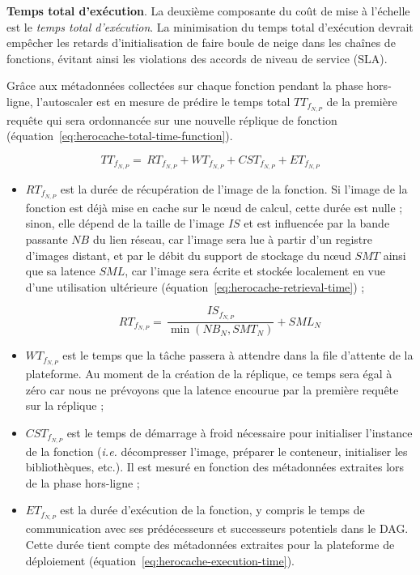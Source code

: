 {\textbf{Temps total d'exécution}. La deuxième composante du coût de mise à l'échelle est le \textit{temps total d'exécution}. La minimisation du temps total d'exécution devrait empêcher les retards d'initialisation de faire boule de neige dans les chaînes de fonctions, évitant ainsi les violations des accords de niveau de service (SLA).

Grâce aux métadonnées collectées sur chaque fonction pendant la phase hors-ligne, l'autoscaler est en mesure de prédire le temps total ${TT}_{{f}_{N, P}}$ de la première requête qui sera ordonnancée sur une nouvelle réplique de fonction (équation~\ref{eq:herocache-total-time-function}).

\begin{equation}
    {TT}_{{f}_{N, P}} = \, {RT}_{{f}_{N, P}} + {WT}_{{f}_{N, P}} + {CST}_{{f}_{N, P}} + {ET}_{{f}_{N, P}}
\label{eq:herocache-total-time-function}
\end{equation}

\begin{itemize}
    \item ${RT}_{{f}_{N, P}}$ est la durée de récupération de l'image de la fonction. Si l'image de la fonction est déjà mise en cache sur le nœud de calcul, cette durée est nulle ; sinon, elle dépend de la taille de l'image $IS$ et est influencée par la bande passante $NB$ du lien réseau, car l'image sera lue à partir d'un registre d'images distant, et par le débit du support de stockage du nœud $SMT$ ainsi que sa latence $SML$, car l'image sera écrite et stockée localement en vue d'une utilisation ultérieure (équation~\ref{eq:herocache-retrieval-time}) ;

    \begin{equation}
        {RT}_{{f}_{N, P}} = \, \frac{IS_{{f}_{N, P}}}{\min (NB_{N}, SMT_{N})} + SML_{N}
        \label{eq:herocache-retrieval-time}
    \end{equation}

    \item ${WT}_{{f}_{N, P}}$ est le temps que la tâche passera à attendre dans la file d'attente de la plateforme. Au moment de la création de la réplique, ce temps sera égal à zéro car nous ne prévoyons que la latence encourue par la première requête sur la réplique ;
    \item ${CST}_{{f}_{N, P}}$ est le temps de démarrage à froid nécessaire pour initialiser l'instance de la fonction (\textit{i.e.} décompresser l'image, préparer le conteneur, initialiser les bibliothèques, etc.). Il est mesuré en fonction des métadonnées extraites lors de la phase hors-ligne ;
    \item ${ET}_{{f}_{N, P}}$ est la durée d'exécution de la fonction, y compris le temps de communication avec ses prédécesseurs et successeurs potentiels dans le DAG. Cette durée tient compte des métadonnées extraites pour la plateforme de déploiement (équation~\ref{eq:herocache-execution-time}).
\end{itemize}

}
